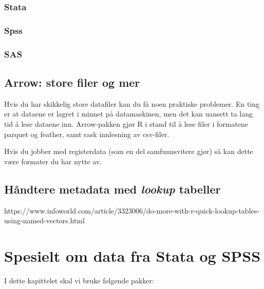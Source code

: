 \documentclass[
  letterpaper,
  DIV=11,
  numbers=noendperiod]{scrreprt}
\begin{document}
\hypertarget{stata}{%
\subsection{Stata}\label{stata}}

\hypertarget{spss}{%
\subsection{Spss}\label{spss}}

\hypertarget{sas}{%
\subsection{SAS}\label{sas}}

\hypertarget{arrow-store-filer-og-mer}{%
\section{Arrow: store filer og mer}\label{arrow-store-filer-og-mer}}

Hvis du har skikkelig store datafiler kan du få noen praktiske
problemer. En ting er at dataene er lagret i minnet på datamaskinen, men
det kan uansett ta lang tid å lese dataene inn. Arrow-pakken gjør R i
stand til å lese filer i formatene parquet og feather, samt rask
innlesning av csv-filer.

Hvis du jobber med registerdata (som en del samfunnsvitere gjør) så kan
dette være formater du har nytte av.

\hypertarget{huxe5ndtere-metadata-med-lookup-tabeller}{%
\section{\texorpdfstring{Håndtere metadata med \emph{lookup}
tabeller}{Håndtere metadata med lookup tabeller}}\label{huxe5ndtere-metadata-med-lookup-tabeller}}

https://www.infoworld.com/article/3323006/do-more-with-r-quick-lookup-tables-using-named-vectors.html


\hypertarget{spesielt-om-data-fra-stata-og-spss}{%
\chapter{Spesielt om data fra Stata og
SPSS}\label{spesielt-om-data-fra-stata-og-spss}}

I dette kapittelet skal vi bruke følgende pakker:
\end{document}
